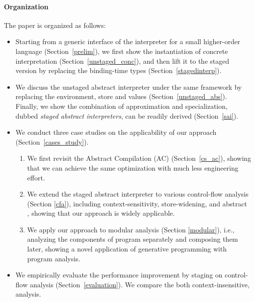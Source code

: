 \paragraph{Organization} The paper is organized as follows:
\begin{itemize}[leftmargin=2em]
\item Starting from a generic interface of the interpreter for a small higher-order language
  (Section~\ref{prelim}), we first show the instantiation of concrete
  interpretation (Section~\ref{unstaged_conc}), and then lift it to the staged
  version by replacing the binding-time types (Section~\ref{stagedinterp}).
\item We discuss the unstaged abstract interpreter under the same framework by
  replacing the environment, store and values (Section~\ref{unstaged_abs}).
  Finally, we show the combination of approximation and specialization, dubbed
  \textit{staged abstract interpreters}, can be readily derived (Section~\ref{sai}).
\item We conduct three case studies on the applicability of our approach
  (Section~\ref{cases_study}).
  \begin{enumerate}
  \item We first revisit the Abstract Compilation (AC)
    \cite{Boucher:1996:ACN:647473.727587} (Section~\ref{cs_ac}), showing that we can
    achieve the same optimization with much less engineering effort.
  \item We extend the staged abstract interpreter to various control-flow
    analysis (Section \ref{cfa}), including context-sensitivity, store-widening, and abstract
    , showing that our approach is widely applicable.
  \item We apply our approach to modular analysis (Section \ref{modular}),
    i.e., analyzing the components of program separately and composing them later,
    showing a novel application of generative programming with program analysis.
  \end{enumerate}
\item We empirically evaluate the performance improvement by staging on
    control-flow analysis (Section~\ref{evaluation}). We compare the both
    context-insensitive,  analysis.
\end{itemize}



